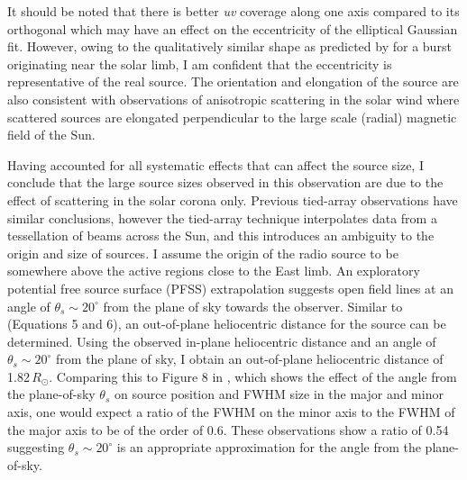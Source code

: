 It should be noted that there is better \textit{uv} coverage along one axis compared to its orthogonal which may have an effect on the eccentricity of the elliptical Gaussian fit. However, owing to the qualitatively similar shape as predicted by \cite{Kontar2019} for a burst originating near the solar limb, I am confident that the eccentricity is representative of the real source. The orientation and elongation of the source are also consistent with observations of anisotropic scattering in the solar wind \citep{Anantharamaiah1994, Ingale2015} where scattered sources are elongated perpendicular to the large scale (radial) magnetic field of the Sun.

Having accounted for all systematic effects that can affect the source size, I conclude that the large source sizes observed in this observation are due to the effect of scattering in the solar corona only. Previous tied-array observations have similar conclusions, however the tied-array technique interpolates data from a tessellation of beams across the Sun, and this introduces an ambiguity to the origin and size of sources. 
I assume the origin of the radio source to be somewhere above the active regions close to the East limb. 
An exploratory potential free source surface (PFSS) extrapolation suggests open field lines at an angle of $ \theta_s {\sim} 20^\circ$ from the plane of sky towards the observer. Similar to \cite{Chrysaphi2018} (Equations 5 and 6), an out-of-plane heliocentric distance for the source can be determined. Using the observed in-plane heliocentric distance and an angle of $ \theta_s {\sim} 20^\circ$ from the plane of sky, I obtain an out-of-plane heliocentric distance of 1.82$\, R_\odot$. Comparing this to Figure 8 in \cite{Kontar2019}, which shows the effect of the angle from the plane-of-sky $\theta_s$ on source position and FWHM size in the major and minor axis, one would expect a ratio of the FWHM on the minor axis to the FWHM of the major axis to be of the order of 0.6. These observations show a ratio of 0.54 suggesting $ \theta_s {\sim} 20^\circ$ is an appropriate approximation for the angle from the plane-of-sky.

